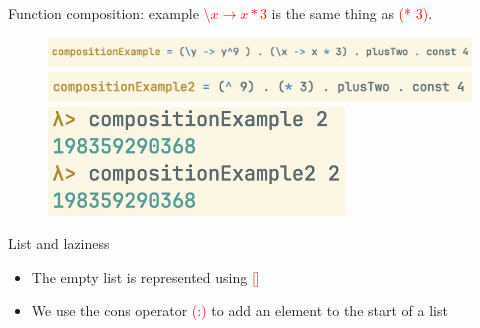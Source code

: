 \documentclass[pdf]{beamer}
\newcommand{\code}[1]{\textcolor{Red}{\textsf{#1}}}
\begin{document}
\begin{frame}{Function composition: example}
  \code{\textbackslash $x \to x * 3$} is the same thing as \code{(* 3)}.
  \begin{figure}[H]
    \includegraphics[width=1.0\textwidth]{compositionExample}
    \vspace{0.2cm}
    \includegraphics[width=1.0\textwidth]{compositionExample2}
    \vspace{0.2cm}
    \includegraphics[width=0.70\textwidth]{compositionExample-ghci}
  \end{figure}
\end{frame}

\begin{frame}{List and laziness}
  \begin{itemize}
  \item The empty list is represented using \code{[]}
  \item We use the cons operator \code{(:)} to add an element to the start of a list
  \end{itemize}
  \begin{figure}[H]
    \centering
    \vspace{0.2cm}
  \end{figure}
\end{frame}
\end{document}
